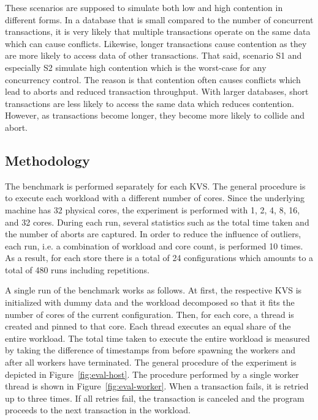 
These scenarios are supposed to simulate both low and high contention in
different forms. In a database that is small compared to the number of
concurrent transactions, it is very likely that multiple transactions operate on
the same data which can cause conflicts. Likewise, longer transactions cause
contention as they are more likely to access data of other transactions. That
said, scenario S1 and especially S2 simulate high contention which is the
worst-case for any concurrency control. The reason is that contention often
causes conflicts which lead to aborts and reduced transaction throughput. With
larger databases, short transactions are less likely to access the same data
which reduces contention. However, as transactions become longer, they become
more likely to collide and abort.

\subsection{Methodology}

The benchmark is performed separately for each KVS. The general procedure is to
execute each workload with a different number of cores. Since the underlying
machine has 32 physical cores, the experiment is performed with 1, 2, 4, 8, 16,
and 32 cores. During each run, several statistics such as the total time taken
and the number of aborts are captured. In order to reduce the influence of
outliers, each run, i.e. a combination of workload and core count, is performed
10 times. As a result, for each store there is a total of 24 configurations
which amounts to a total of 480 runs including repetitions.

A single run of the benchmark works as follows. At first, the respective KVS is
initialized with dummy data and the workload decomposed so that it fits the
number of cores of the current configuration. Then, for each core, a thread is
created and pinned to that core. Each thread executes an equal share of the
entire workload. The total time taken to execute the entire workload is measured
by taking the difference of timestamps from before spawning the workers and
after all workers have terminated. The general procedure of the experiment is
depicted in Figure~\ref{fig:eval-host}. The procedure performed by a single
worker thread is shown in Figure~\ref{fig:eval-worker}. When a transaction
fails, it is retried up to three times. If all retries fail, the transaction is
canceled and the program proceeds to the next transaction in the workload.

